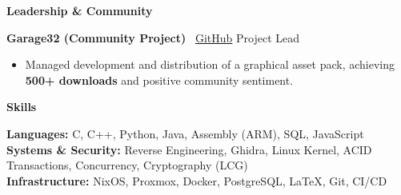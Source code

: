 \documentclass[10pt]{article}
\begin{document}
\vspace{3pt}

\begin{center}
    \textbf{\large Leadership \& Community}
\end{center}
\vspace{-5pt}

\textbf{Garage32 (Community Project)} \textbullet \ \href{https://github.com/jmtorr3/Garage32}{GitHub} \hfill Project Lead \\
\vspace{-2pt}
\begin{itemize}[noitemsep, topsep=0pt, partopsep=0pt, parsep=0pt]
  \item Managed development and distribution of a graphical asset pack, achieving \textbf{500+ downloads} and positive community sentiment.
\end{itemize}

\vspace{5pt}

\begin{center}
    \textbf{\large Skills}
\end{center}
\vspace{-5pt}

\textbf{Languages:} C, C++, Python, Java, Assembly (ARM), SQL, JavaScript \\
\textbf{Systems \& Security:} Reverse Engineering, Ghidra, Linux Kernel, ACID Transactions, Concurrency, Cryptography (LCG) \\
\textbf{Infrastructure:} NixOS, Proxmox, Docker, PostgreSQL, LaTeX, Git, CI/CD
\end{document}
